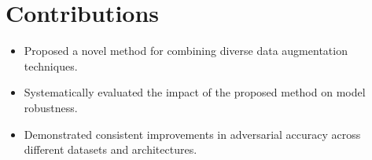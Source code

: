\documentclass{article}
\begin{document}
\section*{Contributions}
\begin{itemize}
    \item Proposed a novel method for combining diverse data augmentation techniques.
    \item Systematically evaluated the impact of the proposed method on model robustness.
    \item Demonstrated consistent improvements in adversarial accuracy across different datasets and architectures.
\end{itemize}



\end{document}
